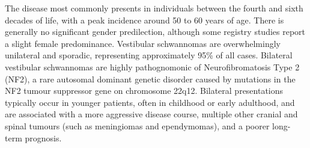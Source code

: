 The disease most commonly presents in individuals between the fourth and sixth decades of life, with a peak incidence around 50 to 60 years of age. There is generally no significant gender predilection, although some registry studies report a slight female predominance. Vestibular schwannomas are overwhelmingly unilateral and sporadic, representing approximately 95\% of all cases. Bilateral vestibular schwannomas are highly pathognomonic of Neurofibromatosis Type 2 (NF2), a rare autosomal dominant genetic disorder caused by mutations in the NF2 tumour suppressor gene on chromosome 22q12. Bilateral presentations typically occur in younger patients, often in childhood or early adulthood, and are associated with a more aggressive disease course, multiple other cranial and spinal tumours (such as meningiomas and ependymomas), and a poorer long-term prognosis.

